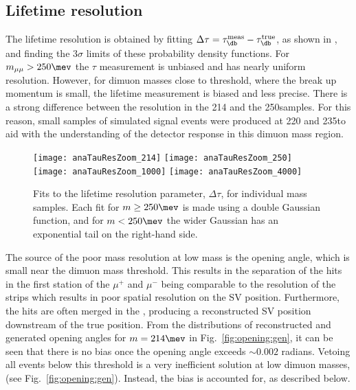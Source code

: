 




\subsection{Lifetime resolution}
The lifetime resolution is obtained by fitting
$\Delta\tau=\tau^\mathrm{meas}_{\db}-\tau^\mathrm{true}_{\db}$, as shown in
, and finding the $3\sigma$ limits of these
probability density functions.
For $m_{\mu\mu} > 250\mev$ the $\tau$ measurement is unbiased and has nearly uniform resolution.
However, for dimuon masses close to threshold, where the break up momentum is small, the lifetime
measurement is biased and less precise.
There is a strong difference between the resolution in the  214 and the 250\mev samples.
For this reason, small samples of simulated signal events were produced at 220 and 235\mev to aid
with the understanding of the detector response in this dimuon mass region.

\begin{figure}
  \begin{center}
    \texttt{[image: anaTauResZoom\_214]}
    \texttt{[image: anaTauResZoom\_250]}
    \texttt{[image: anaTauResZoom\_1000]}
    \texttt{[image: anaTauResZoom\_4000]}
  \end{center}
  \caption{
    Fits to the lifetime resolution parameter, $\Delta\tau$, for individual mass samples.
    Each fit for $m\geq250\mev$ is made using a double Gaussian function, and for $m<250\mev$ the
    wider Gaussian has an exponential tail on the right-hand side.
  }
  \label{fig:taures:zoom}
\end{figure}

The source of the poor mass resolution at low mass is the \mumu opening angle, which is small near
the dimuon mass threshold.
This results in the separation of the hits in the first \velo station of the $\mu^+$ and $\mu^-$
being comparable to the resolution of the \velo strips which results in poor spatial resolution on
the SV position.
Furthermore, the hits are often merged in the \velo, producing a reconstructed SV position
downstream of the true position.
From the distributions of reconstructed and generated opening angles for $m=214\mev$ in
Fig.~\ref{fig:opening:gen},
it can be seen that there is no bias once the \mumu opening angle exceeds $\sim0.002$ radians.
Vetoing all events below this threshold is a very inefficient solution at low dimuon
masses, (see Fig.~\ref{fig:opening:gen}).
Instead, the bias is accounted for, as described below.

